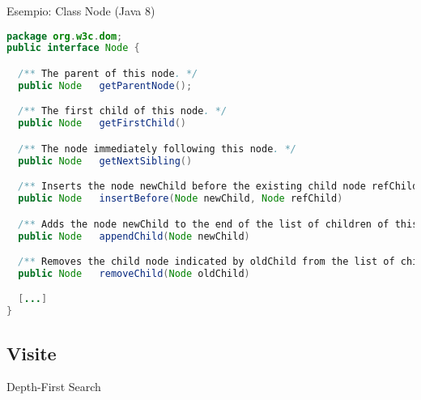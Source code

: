 \begin{frame}[fragile]{Esempio: Class Node (Java 8)}

\scriptsize

\vspace{-12pt}
\begin{lstlisting}[language=java]
package org.w3c.dom;
public interface Node {

  /** The parent of this node. */
  public Node	getParentNode();

  /** The first child of this node. */
  public Node	getFirstChild()

  /** The node immediately following this node. */
  public Node	getNextSibling()

  /** Inserts the node newChild before the existing child node refChild. */
  public Node	insertBefore(Node newChild, Node refChild)

  /** Adds the node newChild to the end of the list of children of this node. */
  public Node	appendChild(Node newChild)

  /** Removes the child node indicated by oldChild from the list of children. */
  public Node	removeChild(Node oldChild)

  [...]
}
\end{lstlisting}
\end{frame}


\subsection{Visite}

\begin{frame}{Depth-First Search}
	

\end{frame}



